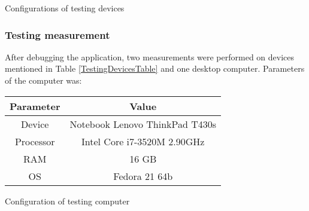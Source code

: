 \begin {table}[h!]
    \centering
    \caption{Configurations of testing devices}
    \label{TestingDevicesTable}
\end{table}

\subsubsection{Testing measurement}
After debugging the application, two measurements were performed on devices mentioned in Table \ref{TestingDevicesTable}
and one desktop computer. Parameters of the computer was:

\begin {table}[h!]
    \begin{tabular}{|c|c|}
        \hline
        \textbf{Parameter} &
        \textbf{Value} \\ \hline \hline
        Device    & Notebook Lenovo ThinkPad T430s \\ \hline
        Processor & Intel Core i7-3520M 2.90GHz    \\ \hline
        RAM       & 16 GB                          \\ \hline
        OS        & Fedora 21 64b                  \\ \hline
    \end{tabular}
    \centering
    \caption{Configuration of testing computer}
    \label{TestingComputerTable}
\end{table}

